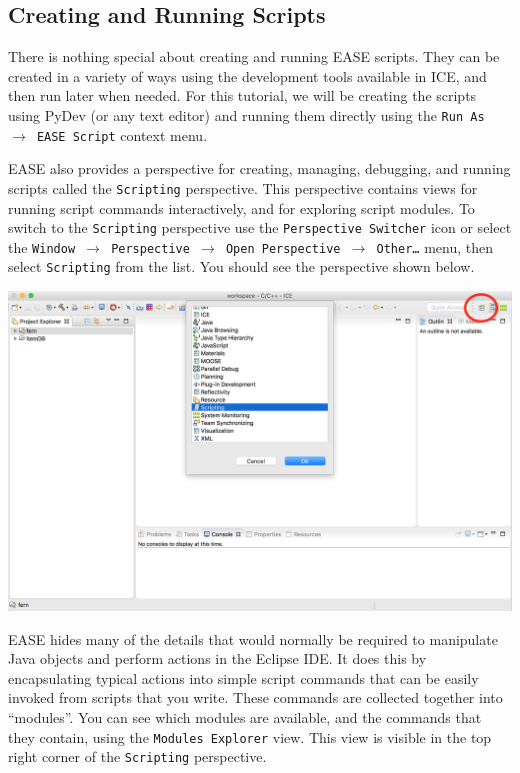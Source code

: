 \subsection{Creating and Running Scripts}

There is nothing special about creating and running EASE scripts. They can be
created in a variety of ways using the development tools available in ICE, and
then run later when needed. For this tutorial, we will be creating the scripts
using PyDev (or any text editor) and running them directly using the \texttt{Run As
$\rightarrow$ EASE Script} context menu.

EASE also provides a perspective for creating, managing, debugging, and running
scripts called the \texttt{Scripting} perspective. This perspective contains
views for running script commands interactively, and for exploring script modules.
To switch to the \texttt{Scripting} perspective use the \texttt{Perspective
Switcher} icon or select the \texttt{Window $\rightarrow$ Perspective
$\rightarrow$ Open Perspective $\rightarrow$ Other\ldots} menu, then select 
\texttt{Scripting} from the list. You should see the perspective shown below.

\begin{center} \includegraphics[width=\textwidth]{images/perspective}
\end{center}

EASE hides many of the details that would normally be required to manipulate
Java objects and perform actions in the Eclipse IDE. It does this by
encapsulating typical actions into simple script commands that can be easily
invoked from scripts that you write. These commands are collected together into
``modules''. You can see which modules are available, and the commands that they
contain, using the \texttt{Modules Explorer} view. This view is visible in
the top right corner of the \texttt{Scripting} perspective. 

